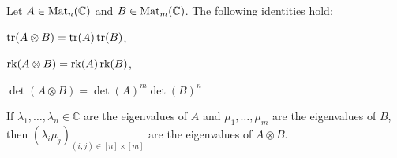 \documentclass[a4paper, oneside, 12pt]{amsart}
\begin{document}
\begin{lemma}\label{lem:rank-trace-det-ev-Kronecker}
  Let \(A \in \operatorname{Mat}_{n}( \mathbb{C})\) and \(B \in \operatorname{Mat}_{m} ( \mathbb{C})\).
  The following identities hold:
  \begin{thmlist}
    \item \(\operatorname{tr}(A\otimes B) = \operatorname{tr}(A)\operatorname{tr}(B)\),
    \item \(\operatorname{rk}(A\otimes B) = \operatorname{rk}(A) \operatorname{rk}(B)\),
    \item \(\det(A\otimes B)= \det(A)^{m}\det(B)^{n}\)
    \item If \(\lambda_{1}, \dots , \lambda_{n} \in \mathbb{C}\) are the eigenvalues of \(A\) and \(\mu_{1}, \dots , \mu_{m}\) are the eigenvalues of \(B\), then \((\lambda_{i}\mu_{j})_{(i,j)\in [n]\times[m]}\) are the eigenvalues of \(A\otimes B\).
  \end{thmlist}
\end{lemma}
\end{document}
